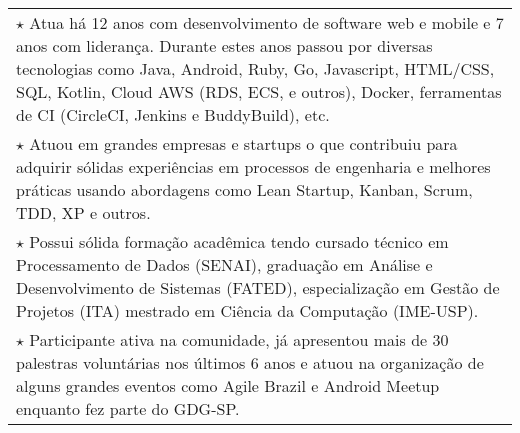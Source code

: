 \documentclass[a4paper, oneside, final]{scrartcl}
\newcommand{\vspc}{\vspace{0.15cm}} %
\begin{document}
\begin{center}
\begin{tabularx}{1\linewidth}{X}




  $\star$ Atua há 12 anos com desenvolvimento de software web e mobile e 7 anos com liderança. Durante estes anos passou por diversas tecnologias como Java, Android, Ruby, Go, Javascript, HTML/CSS, SQL, Kotlin, Cloud AWS (RDS, ECS, e outros), Docker, ferramentas de CI (CircleCI, Jenkins e BuddyBuild), etc.  \vspc \\

  $\star$ Atuou em grandes empresas e startups o que contribuiu para adquirir sólidas experiências em processos de engenharia e melhores práticas usando abordagens como Lean Startup, Kanban, Scrum, TDD, XP e outros. \vspc \\

  $\star$ Possui sólida formação acadêmica tendo cursado técnico em Processamento de Dados (SENAI), graduação em Análise e Desenvolvimento de Sistemas (FATED), especialização em Gestão de Projetos (ITA) mestrado em Ciência da Computação (IME-USP). \vspc \\

  $\star$ Participante ativa na comunidade, já apresentou mais de 30 palestras voluntárias nos últimos 6 anos e atuou na organização de alguns grandes eventos como Agile Brazil e Android Meetup enquanto fez parte do GDG-SP.
\end{tabularx}

  

\end{center}
\end{document}
